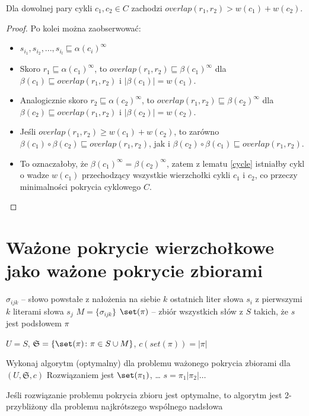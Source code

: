 \begin{lemma}
\label{overlap}
Dla dowolnej pary cykli $c_1, c_2 \in C$ zachodzi $overlap(r_1, r_2) > w(c_1) + w(c_2)$.
\end{lemma}
\begin{proof}
Po kolei można zaobserwować:
\begin{itemize}
\item $s_{i_1}, s_{i_2}, ..., s_{i_l} \sqsubseteq \alpha(c_i)^\infty$
\item Skoro $r_1 \sqsubseteq \alpha(c_1)^\infty$, to $overlap(r_1, r_2) \sqsubseteq \beta(c_1)^\infty$ dla $\beta(c_1) \sqsubseteq overlap(r_1, r_2)$ i $|\beta(c_1)| = w(c_1)$.
\item Analogicznie skoro $r_2 \sqsubseteq \alpha(c_2)^\infty$, to $overlap(r_1, r_2) \sqsubseteq \beta(c_2)^\infty$ dla $\beta(c_2) \sqsubseteq overlap(r_1, r_2)$ i $|\beta(c_2)| = w(c_2)$.
\item Jeśli $overlap(r_1, r_2) \geq w(c_1) + w(c_2)$, to zarówno $\beta(c_1) \circ \beta(c_2) \sqsubseteq overlap(r_1, r_2)$, jak i $\beta(c_2) \circ \beta(c_1) \sqsubseteq overlap(r_1, r_2)$.
\item To oznaczałoby, że $\beta(c_1)^\infty = \beta(c_2)^\infty$, zatem z lematu \ref{cycle} istniałby cykl o wadze $w(c_1)$ przechodzący wszystkie wierzchołki cykli $c_1$ i $c_2$, co przeczy minimalności pokrycia cyklowego $C$.
\end{itemize}
\end{proof}

\section{Ważone pokrycie wierzchołkowe jako ważone pokrycie zbiorami}

$\sigma_{ijk}$ -- słowo powstałe z nałożenia na siebie $k$ ostatnich liter słowa $s_i$ z pierwszymi $k$ literami słowa $s_j$
$M = \{\sigma_{ijk}\}$
$\set(\pi)$ -- zbiór wszystkich słów z $S$ takich, że $s$ jest podsłowem $\pi$

$U = S$, $\mathfrak{S} = \{\set(\pi)\colon \pi \in S \cup M\}$, $c(set(\pi)) = |\pi|$

Wykonaj algorytm (optymalny) dla problemu ważonego pokrycia zbiorami dla $(U, \mathfrak{S}, c)$
Rozwiązaniem jest $\set(\pi_1)$, \ldots
\return $s = \pi_1 | \pi_2 | \ldots$

\begin{theorem}
	Jeśli rozwiązanie problemu pokrycia zbioru jest optymalne, to algorytm jest $2$-przybliżony dla problemu najkrótszego wspólnego nadsłowa
\end{theorem}

